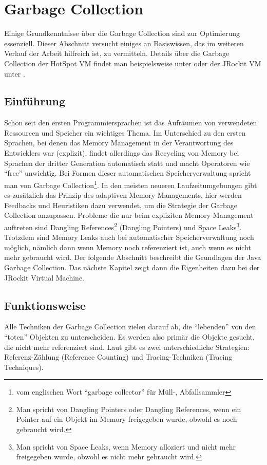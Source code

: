 \chapter{Garbage Collection}\label{grundlagen_gc}
Einige Grundkenntnisse über die Garbage Collection sind zur Optimierung essenziell. Dieser Abschnitt versucht einiges an Basiswissen, das im weiteren Verlauf der Arbeit hilfreich ist, zu vermitteln. Details über die Garbage Collection der HotSpot VM findet man beispielsweise unter \cite{langerkreftJavaCore} oder der JRockit VM unter \cite{lagergren2010oracle}.

\section{Einführung}
Schon seit den ersten Programmiersprachen ist das Aufräumen von verwendeten Ressourcen und Speicher ein wichtiges Thema. Im Unterschied zu den ersten Sprachen, bei denen das Memory Management in der Verantwortung des Entwicklers war (explizit), findet allerdings das Recycling von Memory bei Sprachen der dritter Generation automatisch statt und macht Operatoren wie ``free'' unwichtig. Bei Formen dieser automatischen Speicherverwaltung spricht man von Garbage Collection\footnote{vom englischen Wort ``garbage collector'' für Müll-, Abfallsammler}. In den meisten neueren Laufzeitumgebungen gibt es zusätzlich das Prinzip  des adaptiven Memory Managements, hier werden Feedbacks und Heuristiken dazu verwendet, um die Strategie der Garbage Collection anzupassen.
Probleme die nur beim expliziten Memory Management auftreten sind  Dangling References\footnote{Man spricht von Dangling Pointers oder Dangling References, wenn ein Pointer auf ein Objekt im Memory freigegeben wurde, obwohl es noch gebraucht wird.} (Dangling Pointers) und Space Leaks\footnote{Man spricht von Space Leaks, wenn Memory alloziert und nicht mehr freigegeben wurde, obwohl es nicht mehr gebraucht wird.\cite{sunMemoryManagementWP}}. Trotzdem sind Memory Leaks auch bei automatischer Speicherverwaltung noch möglich, nämlich dann wenn Memory noch referenziert ist, auch wenn es nicht mehr gebraucht wird.
Der folgende Abschnitt beschreibt die Grundlagen der Java Garbage Collection. Das nächste Kapitel zeigt dann die Eigenheiten dazu bei der JRockit Virtual Machine.

\section{Funktionsweise}
Alle Techniken der Garbage Collection zielen darauf ab, die ``lebenden'' von den ``toten'' Objekten zu unterscheiden. Es werden also primär die Objekte gesucht, die nicht mehr referenziert sind. Laut \cite[S. 77]{lagergren2010oracle} gibt es zwei unterschiedliche Strategien: Referenz-Zählung (Reference Counting) und Tracing-Techniken (Tracing Techniques).

